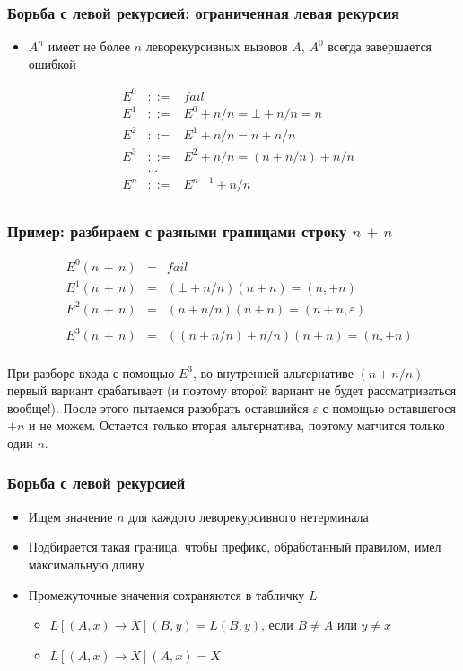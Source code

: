 \documentclass{beamer}
\begin{document}
\begin{frame}[fragile]
  \transwipe[direction=90]
  \frametitle{Борьба с левой рекурсией: ограниченная левая рекурсия}
\begin{itemize}
  \item $A^n$ имеет не более $n$ леворекурсивных вызовов $A$, $A^0$ всегда 
завершается ошибкой
\end{itemize}
$$
\begin{array}{crcl}
&E^0 & ::= & fail \\ 
&E^1 & ::= & E^0 + n / n = \bot + n / n = n \\
&E^2 & ::= & E^1 + n / n = n + n / n \\
&E^3 & ::= & E^2 + n / n = (n + n / n) + n / n\\
& & \dots &  \\
&E^n & ::= & E^{n-1} + n / n \\
\end{array}
$$ 
\end{frame}


\begin{frame}[fragile]
  \transwipe[direction=90]
  \frametitle{Пример: разбираем с разными границами строку $n \, + \, n$}
$$
\begin{array}{crcl}
&E^0 (n \, + \, n) & = & fail \\ 
&E^1 (n \, + \, n) & = & (\bot + n / n) (n  +  n) = (n, +  n) \\
&E^2 (n \, + \, n) & = & (n + n / n) (n + n) = (n + n, \varepsilon) \\~\\
&E^3 (n \, + \, n) & = & ((n + n / n) + n / n) (n + n) = (n, + n) \\
\end{array}
$$ 

При разборе входа с помощью $E^3$, во внутренней альтернативе $(n + n / n)$ 
первый вариант срабатывает (и поэтому второй вариант не будет рассматриваться вообще!). 
После этого пытаемся разобрать оставшийся $\varepsilon$ с помощью оставшегося $+ n$ и не можем. 
Остается только вторая альтернатива, поэтому матчится только один $n$.
\end{frame}


\begin{frame}[fragile]
  \transwipe[direction=90]
  \frametitle{Борьба с левой рекурсией}
\begin{itemize}
  \item Ищем значение $n$ для каждого леворекурсивного нетерминала
  \item Подбирается такая граница, чтобы префикс, обработанный правилом, имел 
максимальную длину
  \item Промежуточные значения сохраняются в табличку $L$
  \begin{itemize}
    \item $L[(A, x) \rightarrow X](B, y) = L(B, y)$, если $B \neq A$ или $y 
\neq x$
    \item $L[(A, x) \rightarrow X](A, x) = X$
  \end{itemize}
\end{itemize}
\end{frame}
\end{document}
